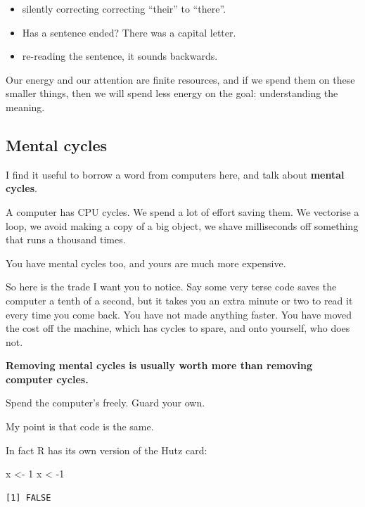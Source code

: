 \documentclass[
  letterpaper,
  justified,
  a4paper]{tufte-book}
\makeatletter
\newenvironment{Shaded}{\begin{snugshade}}{\end{snugshade}}
\newcommand{\DecValTok}[1]{\textcolor[rgb]{0.68,0.00,0.00}{#1}}
\newcommand{\NormalTok}[1]{\textcolor[rgb]{0.00,0.23,0.31}{#1}}
\newcommand{\OtherTok}[1]{\textcolor[rgb]{0.00,0.23,0.31}{#1}}
\newcommand{\SpecialCharTok}[1]{\textcolor[rgb]{0.37,0.37,0.37}{#1}}
\providecommand{\tightlist}{%
  \setlength{\itemsep}{0pt}\setlength{\parskip}{0pt}}
\providecommand{\tightlist}{%
  \setlength{\itemsep}{0pt}\setlength{\parskip}{0pt}}
\let\rbporigShaded\Shaded
\let\rbporigendShaded\endShaded
\renewenvironment{Shaded}{%
  \begingroup
  \ifdim\linewidth=\rbpbodywidth
    \advance\linewidth by \@tufte@overhang
    \advance\hsize by \@tufte@overhang
    \advance\columnwidth by \@tufte@overhang
  \fi
  \rbporigShaded
}{%
  \rbporigendShaded
  \endgroup
}
\makeatother
\begin{document}
\begin{itemize}
\tightlist
\item
  silently correcting correcting ``their'' to ``there''.
\item
  Has a sentence ended? There was a capital letter.
\item
  re-reading the sentence, it sounds backwards.
\end{itemize}

Our energy and our attention are finite resources, and if we spend them
on these smaller things, then we will spend less energy on the goal:
understanding the meaning.

\subsection{Mental cycles}\label{mental-cycles}

I find it useful to borrow a word from computers here, and talk about
\textbf{mental cycles}.

A computer has CPU cycles. We spend a lot of effort saving them. We
vectorise a loop, we avoid making a copy of a big object, we shave
milliseconds off something that runs a thousand times.

You have mental cycles too, and yours are much more expensive.

So here is the trade I want you to notice. Say some very terse code
saves the computer a tenth of a second, but it takes you an extra minute
or two to read it every time you come back. You have not made anything
faster. You have moved the cost off the machine, which has cycles to
spare, and onto yourself, who does not.

\textbf{Removing mental cycles is usually worth more than removing
computer cycles.}

Spend the computer's freely. Guard your own.

My point is that code is the same.

In fact R has its own version of the Hutz card:

\begin{Shaded}
\begin{Highlighting}[]
\NormalTok{x }\OtherTok{\textless{}{-}} \DecValTok{1}
\NormalTok{x }\SpecialCharTok{\textless{}} \SpecialCharTok{{-}}\DecValTok{1}
\end{Highlighting}
\end{Shaded}

\begin{verbatim}
[1] FALSE
\end{verbatim}
\end{document}
